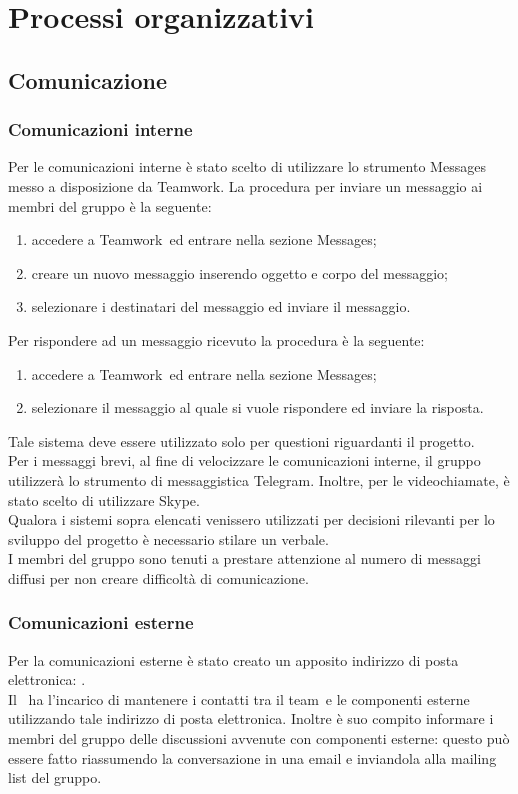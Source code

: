 \documentclass[../NormeProgetto.tex]{subfiles}
\begin{document}
\section{Processi organizzativi}
	\subsection{Comunicazione}
		\subsubsection{Comunicazioni interne}
			Per le comunicazioni interne è stato scelto di utilizzare lo strumento Messages messo a disposizione da Teamwork\g.
			La procedura per inviare un messaggio ai membri del gruppo è la seguente:
			\begin{enumerate}
				\item accedere a Teamwork\g\ ed entrare nella sezione Messages;
				\item creare un nuovo messaggio inserendo oggetto e corpo del messaggio;
				\item selezionare i destinatari del messaggio ed inviare il messaggio.
			\end{enumerate}
			Per rispondere ad un messaggio ricevuto la procedura è la seguente:
			\begin{enumerate}
				\item accedere a Teamwork\g\ ed entrare nella sezione Messages;
				\item selezionare il messaggio al quale si vuole rispondere ed inviare la risposta.
			\end{enumerate}
			 Tale sistema deve essere utilizzato solo per questioni riguardanti il progetto. \\
			Per i messaggi brevi, al fine di velocizzare le comunicazioni interne, il gruppo utilizzerà lo strumento di messaggistica Telegram\g. Inoltre, per le videochiamate, è stato scelto di utilizzare Skype\g. \\
			Qualora i sistemi sopra elencati venissero utilizzati per decisioni rilevanti per lo sviluppo del progetto è necessario stilare un verbale.\\
			I membri del gruppo sono tenuti a prestare attenzione al numero di messaggi diffusi per non creare difficoltà di comunicazione. 
		\subsubsection{Comunicazioni esterne}
			Per la comunicazioni esterne è stato creato un apposito indirizzo di posta elettronica: \mailleaf. \\
			Il \responsabilediprogetto\ ha l'incarico di mantenere i contatti tra il team\g\ e le componenti esterne utilizzando tale indirizzo di posta elettronica. Inoltre è suo compito informare i membri del gruppo delle discussioni avvenute con componenti esterne: questo può essere fatto riassumendo la conversazione in una email e inviandola alla mailing list del gruppo.
\end{document}
